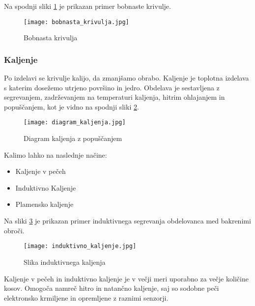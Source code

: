 Na spodnji sliki \ref{bobnaste_krivulje} je prikazan primer
bobnaste krivulje.

\begin{figure}[H]
	\begin{center}
		\texttt{[image: bobnasta\_krivulja.jpg]}
		\caption{Bobnasta krivulja
			\cite{lasten}}
		\label{bobnaste_krivulje}
	\end{center}
\end{figure}

\newpage
\subsubsection{Kaljenje}
Po izdelavi se krivulje kalijo, da zmanjšamo obrabo. Kaljenje
je toplotna izdelava s katerim dosežemo utrjeno površino in jedro.
Obdelava je sestavljena z segrevanjem, zadrževanjem na temperaturi
kaljenja, hitrim ohlajanjem in popuščanjem, kot je vidno na spodnji
sliki \ref{diagram_kaljenja}.

\begin{figure}[H]
	\begin{center}
		\texttt{[image: diagram\_kaljenja.jpg]}
		\caption{Diagram kaljenja z popuščanjem
			\cite{diagram_kaljenja}}
		\label{diagram_kaljenja}
	\end{center}
\end{figure}

Kalimo lahko na naslednje načine:
\begin{itemize}
	\item Kaljenje v pečeh
	\item Induktivno Kaljenje
	\item Plamensko kaljenje
\end{itemize}

Na sliki \ref{induktivno_kaljenje} je prikazan primer induktivnega
segrevanja obdelovanca med bakrenimi obroči.

\begin{figure}[H]
	\begin{center}
		\texttt{[image: induktivno\_kaljenje.jpg]}
		\caption{Slika induktivnega kaljenja
			\cite{lasten}}
		\label{induktivno_kaljenje}
	\end{center}
\end{figure}

Kaljenje v pečeh in induktivno kaljenje je v večji meri uporabno
za večje količine kosov. Omogoča namreč hitro in natančno kaljenje,
saj so sodobne peči elektronsko krmiljene in opremljene z raznimi senzorji.

